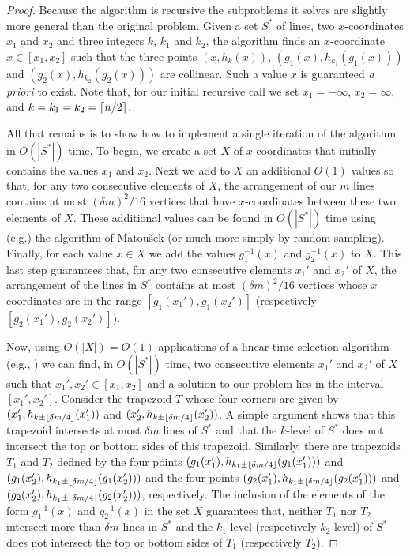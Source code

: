 \documentclass[lotsofwhite]{patmorin}
\begin{document}
\begin{proof}
Because the algorithm is recursive the subproblems it solves are
slightly more general than the original problem.  Given a set $S^*$ of
lines, two $x$-coordinates $x_1$ and $x_2$ and three integers $k$,
$k_1$ and $k_2$, the algorithm finds an $x$-coordinate $x\in[x_1,x_2]$
such that the three points $(x,h_k(x))$, $(g_1(x),h_{k_1}(g_1(x)))$
and $(g_2(x),h_{k_2}(g_2(x)))$ are collinear.  Such a value $x$ is
guaranteed \emph{a priori} to exist.  Note that, for our initial
recursive call we set $x_1=-\infty$, $x_2=\infty$, and
$k=k_1=k_2=\left\lceil n/2 \right\rceil$.

All that remains is to show how to implement a single iteration of the
algorithm in $O(|S^*|)$ time.  To begin, we create a set $X$ of
$x$-coordinates that initially contains the values $x_1$ and $x_2$.
Next we add to $X$ an additional $O(1)$ values so that, for any two
consecutive elements of $X$, the arrangement of our $m$ lines contains
at most $(\delta m)^2/16$ vertices that have $x$-coordinates between
these two elements of $X$.  These additional values can be found in
$O(|S^*|)$ time using (e.g.) the algorithm of Matou\v{s}ek \cite{m91}
(or much more simply by random sampling).  Finally, for each value
$x\in X$ we add the values $g_1^{-1}(x)$ and $g_2^{-1}(x)$ to $X$.
This last step guarantees that, for any two consecutive elements
$x_1'$ and $x_2'$ of $X$, the arrangement of the lines in $S^*$
contains at most $(\delta m)^2/16$ vertices whose $x$ coordinates are
in the range $[g_1(x_1'),g_1(x_2')]$ (respectively
$[g_2(x_1'),g_2(x_2')]$). 

Now, using $O(|X|)=O(1)$ applications of a linear time selection
algorithm (e.g., \cite{bea73}) we can 
find, in $O(|S^*|)$ time, two consecutive elements $x_1'$
and $x_2'$ of $X$ such that $x_1',x_2'\in[x_1,x_2]$ and a solution to our
problem lies in the interval $[x_1',x_2']$.  Consider the trapezoid
$T$ whose four corners are given by $(x_1',h_{k\pm\left\lfloor \delta
m/4 \right\rfloor}(x_1'))$ and $(x_2',h_{k\pm\left\lfloor \delta m/4 \right\rfloor}(x_2'))$.  A simple
argument \cite{lms94} shows that this trapezoid intersects at
most $\delta m$ lines of $S^*$ and that the $k$-level of $S^*$ does
not intersect the top or bottom sides of this trapezoid.  Similarly,
there are trapezoids $T_1$ and $T_2$ defined by the four points 
$(g_1(x_1'),h_{k_1\pm\left\lfloor \delta m/4 \right\rfloor}(g_1(x_1')))$ and
$(g_1(x_2'),h_{k_1\pm\left\lfloor \delta m/4 \right\rfloor}(g_1(x_2')))$ and the four
points
$(g_2(x_1'),h_{k_1\pm\left\lfloor \delta m/4 \right\rfloor}(g_2(x_1')))$ and
$(g_2(x_2'),h_{k_1\pm\left\lfloor \delta m/4 \right\rfloor}(g_2(x_2')))$, respectively.
The inclusion of the elements of the form $g_1^{-1}(x)$ and
$g_2^{-1}(x)$ in the set $X$ guarantees that, neither $T_1$ 
nor $T_2$ intersect more than $\delta m$ lines in $S^*$
and the $k_1$-level (respectively $k_2$-level) of $S^*$ does not
intersect the top or bottom sides of $T_1$ (respectively $T_2$).


\end{proof}
\end{document}
